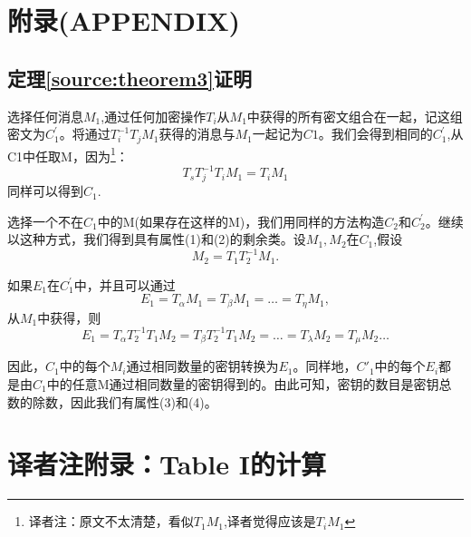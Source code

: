 \documentclass[]{article}
\begin{document}
\newpage
%   
%
\section*{附录(APPENDIX)}

\subsection*{定理\ref{source:theorem3}证明}
选择任何消息$M_1$,通过任何加密操作$T_i$从$M_1$中获得的所有密文组合在一起，记这组密文为$C_1^{'}$。将通过$T_i^{-1}T_jM_1$获得的消息与$M_1$一起记为$C1$。我们会得到相同的$C_1^{'}$,从C1中任取M，因为\footnote{译者注：原文不太清楚，看似$T_1M_1$,译者觉得应该是$T_iM_1$}：
\[T_sT_j^{-1}T_iM_1=T_iM_1\]
同样可以得到$C_1$.

选择一个不在$C_1$中的M(如果存在这样的M)，我们用同样的方法构造$C_2$和$C_2^{'}$。继续以这种方式，我们得到具有属性(1)和(2)的剩余类。设$M_1,M_2$在$C_1$,假设
\[M_2=T_1T_2^{-1}M_1.\]

如果$E_1$在$C_1^{'}$中，并且可以通过
\[E_1=T_{\alpha}M_1 =T_{\beta}M_1= \ldots=T_{\eta}M_1, \]
从$M_1$中获得，则
\[E_1=T_{\alpha}T_2^{-1}T_1M_2 = T_{\beta}T_2^{-1}T_1M_2 = \ldots =T_{\lambda}M_2 = T_{\mu}M_2\ldots\]


因此，$C_1$中的每个$M_i$通过相同数量的密钥转换为$E_1$。同样地，$C'_1$中的每个$E_i$都是由$C_1$中的任意M通过相同数量的密钥得到的。由此可知，密钥的数目是密钥总数的除数，因此我们有属性(3)和(4)。

\newpage
%   
%

\section*{译者注附录：Table I的计算}\label{app:table1}
\end{document}
